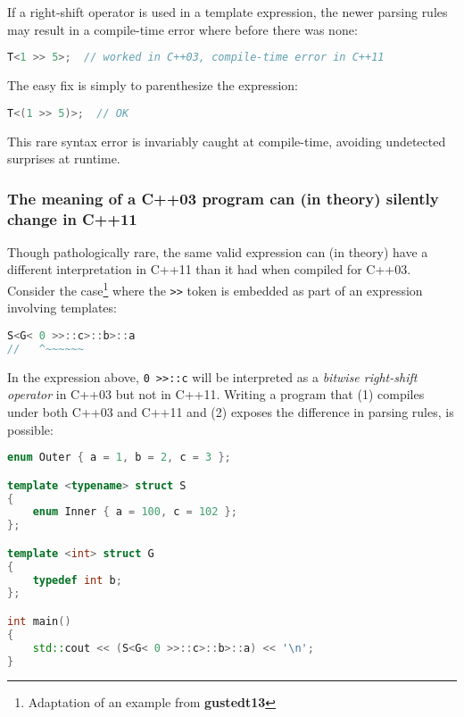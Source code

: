 If a right-shift operator is used in a template expression, the newer
parsing rules may result in a compile-time error where before there was
none:

\begin{lstlisting}[language=C++]
T<1 >> 5>;  // worked in C++03, compile-time error in C++11
\end{lstlisting}
    
\noindent The easy fix is simply to parenthesize the expression:

\begin{lstlisting}[language=C++]
T<(1 >> 5)>;  // OK
\end{lstlisting}
    
\noindent This rare syntax error is invariably caught at compile-time, avoiding undetected surprises at runtime.

\subsubsection[The meaning of a C++03 program can (in theory) silently change in C++11]{The meaning of a C++03 program can (in theory) silently change in C++11}\label{the-meaning-of-a-c++03-program-can-(in-theory)-silently-change-in-c++11}

Though pathologically rare, the same valid expression can (in theory) have a different interpretation in C++11 than it had when compiled for C++03.
Consider the case{\cprotect\footnote{Adaptation of an example from \textbf{{gustedt13}}}} where the
\texttt{>>} token is embedded as part of an expression involving
templates:

\begin{lstlisting}[language=C++]
S<G< 0 >>::c>::b>::a
//   ^~~~~~~
\end{lstlisting}
    
\noindent In the expression above, \texttt{0}~\texttt{>>::c} will be interpreted
as a \emph{bitwise right-shift operator} in C++03 but not in C++11. Writing a program that (1) compiles under both C++03 and
C++11 and (2) exposes the difference in parsing rules, is possible:

\begin{lstlisting}[language=C++]
enum Outer { a = 1, b = 2, c = 3 };

template <typename> struct S
{
    enum Inner { a = 100, c = 102 };
};

template <int> struct G
{
    typedef int b;
};

int main()
{
    std::cout << (S<G< 0 >>::c>::b>::a) << '\n';
}
\end{lstlisting}
    
